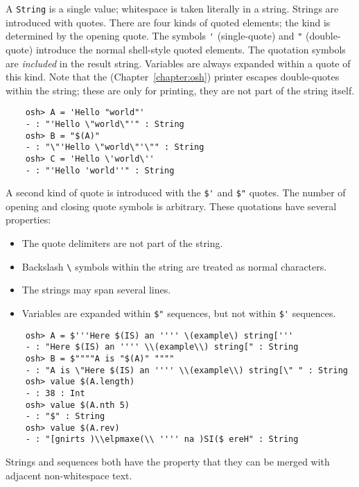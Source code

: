 A \verb+String+ is a single value; whitespace is taken literally in a string.  Strings are introduced
with quotes.  There are four kinds of quoted elements; the kind is determined by the opening quote.
The symbols \verb+'+ (single-quote) and \verb+"+ (double-quote) introduce the normal shell-style
quoted elements.  The quotation symbols are \emph{included} in the result string.  Variables are
always expanded within a quote of this kind.  Note that the 
(Chapter~\ref{chapter:osh}) printer
escapes double-quotes within the string; these are only for printing, they are not part of the
string itself.

\begin{verbatim}
    osh> A = 'Hello "world"'
    - : "'Hello \"world\"'" : String
    osh> B = "$(A)"
    - : "\"'Hello \"world\"'\"" : String
    osh> C = 'Hello \'world\''
    - : "'Hello 'world''" : String
\end{verbatim}

A second kind of quote is introduced with the \verb+$'+ and \verb+$"+
quotes.  The number of opening and closing quote symbols is arbitrary.
These quotations have several properties:
\begin{itemize}
\item The quote delimiters are not part of the string.
\item Backslash \verb+\+ symbols within the string are treated as normal characters.
\item The strings may span several lines.
\item Variables are expanded within \verb+$"+ sequences, but not within \verb+$'+
  sequences.
\end{itemize}

\begin{verbatim}
    osh> A = $'''Here $(IS) an '''' \(example\) string['''
    - : "Here $(IS) an '''' \\(example\\) string[" : String
    osh> B = $""""A is "$(A)" """"
    - : "A is \"Here $(IS) an '''' \\(example\\) string[\" " : String
    osh> value $(A.length)
    - : 38 : Int
    osh> value $(A.nth 5)
    - : "$" : String
    osh> value $(A.rev)
    - : "[gnirts )\\elpmaxe(\\ '''' na )SI($ ereH" : String
\end{verbatim}

Strings and sequences both have the property that they can be merged
with adjacent non-whitespace text.

